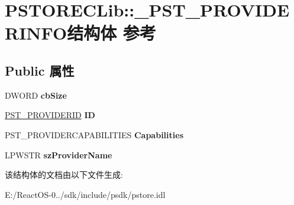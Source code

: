 \hypertarget{struct_p_s_t_o_r_e_c_lib_1_1___p_s_t___p_r_o_v_i_d_e_r_i_n_f_o}{}\section{P\+S\+T\+O\+R\+E\+C\+Lib\+:\+:\+\_\+\+P\+S\+T\+\_\+\+P\+R\+O\+V\+I\+D\+E\+R\+I\+N\+F\+O结构体 参考}
\label{struct_p_s_t_o_r_e_c_lib_1_1___p_s_t___p_r_o_v_i_d_e_r_i_n_f_o}
\subsection*{Public 属性}
\begin{DoxyCompactItemize}
\item 
\mbox{\label{struct_p_s_t_o_r_e_c_lib_1_1___p_s_t___p_r_o_v_i_d_e_r_i_n_f_o_a76296e27f4858f1839428f4107e71a85}} 
D\+W\+O\+RD {\bfseries cb\+Size}
\item 
\mbox{\label{struct_p_s_t_o_r_e_c_lib_1_1___p_s_t___p_r_o_v_i_d_e_r_i_n_f_o_af10812d99fac53a75228ddbc490b0746}} 
\hyperlink{interface_g_u_i_d}{P\+S\+T\+\_\+\+P\+R\+O\+V\+I\+D\+E\+R\+ID} {\bfseries ID}
\item 
\mbox{\label{struct_p_s_t_o_r_e_c_lib_1_1___p_s_t___p_r_o_v_i_d_e_r_i_n_f_o_a681dc35a9661286eeaea9a2c8405e582}} 
P\+S\+T\+\_\+\+P\+R\+O\+V\+I\+D\+E\+R\+C\+A\+P\+A\+B\+I\+L\+I\+T\+I\+ES {\bfseries Capabilities}
\item 
\mbox{\label{struct_p_s_t_o_r_e_c_lib_1_1___p_s_t___p_r_o_v_i_d_e_r_i_n_f_o_aa93aee1d9d345de5e21a6902d62ba41a}} 
L\+P\+W\+S\+TR {\bfseries sz\+Provider\+Name}
\end{DoxyCompactItemize}


该结构体的文档由以下文件生成\+:\begin{DoxyCompactItemize}
\item 
E\+:/\+React\+O\+S-\/0../sdk/include/psdk/pstore.\+idl\end{DoxyCompactItemize}
